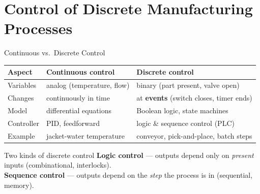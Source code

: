 \documentclass[aspectratio=169]{beamer}
\begin{document}
	\section{Control of Discrete Manufacturing Processes}
	\begin{frame}{Continuous vs.\ Discrete Control}
		\renewcommand{\arraystretch}{1.3}
		\centering
		\small
		\begin{tabular}{@{}>{\raggedright}p{3.0cm}>{\raggedright}p{4.6cm}>{\raggedright\arraybackslash}p{4.6cm}@{}}
			\toprule
			\textbf{Aspect} & \textbf{Continuous control} & \textbf{Discrete control} \\
			\midrule
			Variables   & analog (temperature, flow)     & binary (part present, valve open) \\
			Changes     & continuously in time           & at \textbf{events} (switch closes, timer ends) \\
			Model       & differential equations         & Boolean logic, state machines \\
			Controller  & PID, feedforward               & logic \& sequence control (PLC) \\
			Example     & jacket-water temperature       & conveyor, pick-and-place, batch steps \\
			\bottomrule
		\end{tabular}
		\vspace{0.3cm}
		\begin{block}{Two kinds of discrete control}
			\small \textbf{Logic control} --- outputs depend only on \emph{present} inputs (combinational, interlocks).\\
			\textbf{Sequence control} --- outputs depend on the \emph{step} the process is in (sequential, memory).
		\end{block}
	\end{frame}
\end{document}
